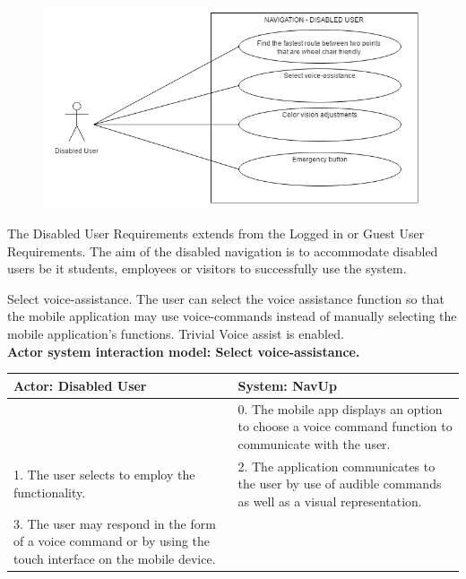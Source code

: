 \begin{figure} 
  \includegraphics[width=\textwidth]{diagrams/Specific_Requirements/Disabled_User_Use_Case_Diagram.png}
\end{figure}

The Disabled User Requirements extends from the Logged in or Guest User Requirements. The aim of the disabled navigation is to accommodate disabled users be it students, employees or visitors to successfully use the system.
\\
\bigskip

\FuncReq
{Select voice-assistance.}
{The user can select the voice assistance function so that the mobile application may use voice-commands instead of manually selecting the mobile application's functions.}
{Trivial}
{Voice assist is enabled.}
    \\
    \textbf{Actor system interaction model: Select voice-assistance.}\\
    \begin{tabular}{ | p{6cm} | p{6cm} |}
    \hline
    Actor: Disabled User & System: NavUp \\ \hline
     & 0. The mobile app displays an option to choose a voice command function to communicate with the user.\\ \hline
    1. The user selects to employ the functionality. & 2. The application communicates to the user by use of audible commands as well as a visual representation.\\ \hline
    3. The user may respond in the form of a voice command or by using the touch interface on the mobile device. & \\ \hline
    
    \end{tabular}
\\
\bigskip

